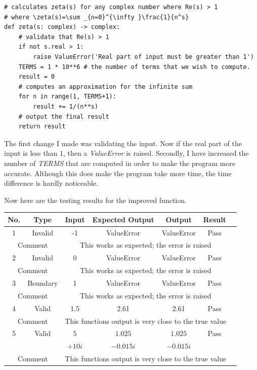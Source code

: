 \documentclass{article}
\begin{document}
\begin{lstlisting}
# calculates zeta(s) for any complex number where Re(s) > 1
# where \zeta(s)=\sum _{n=0}^{\infty }\frac{1}{n^s}
def zeta(s: complex) -> complex:
    # validate that Re(s) > 1
    if not s.real > 1:
        raise ValueError('Real part of input must be greater than 1')
    TERMS = 1 * 10**6 # the number of terms that we wish to compute.
    result = 0
    # computes an approximation for the infinite sum
    for n in range(1, TERMS+1):
        result += 1/(n**s)
    # output the final result
    return result
\end{lstlisting}

The first change I made was validating the input. Now if the real part of the input is less than $1$, then a \textit{ValueError} is raised. Secondly, I have increased the number of \textit{TERMS} that are computed in order to make the program more accurate. Although this does make the program take more time, the time difference is hardly noticeable.

Now here are the testing results for the improved function.

\begin{table}[ht]
    \centering
    \begin{tabular}{|c|c|c|c|c|c|c|}
    \hline
    \textbf{No.} & \textbf{Type} & \textbf{Input} & \textbf{Expected Output} & \textbf{Output} & \textbf{Result}\\
    \hline
    \hline
    1 & Invalid & -1 & ValueError & ValueError & Pass\\
    \hline
    \multicolumn{2}{|c|}{Comment} & \multicolumn{4}{|c|}{This works as expected; the error is raised}\\
    \hline
    \hline
    2 & Invalid & 0 & ValueError & ValueError & Pass\\
    \hline
    \multicolumn{2}{|c|}{Comment} & \multicolumn{4}{|c|}{This works as expected; the error is raised}\\
    \hline
    \hline
    3 & Boundary & 1 & ValueError & ValueError & Pass\\
    \hline
    \multicolumn{2}{|c|}{Comment} & \multicolumn{4}{|c|}{This works as expected; the error is raised}\\
    \hline
    \hline
    4 & Valid & 1.5 & 2.61 & 2.61 & Pass\\
    \hline
    \multicolumn{2}{|c|}{Comment} & \multicolumn{4}{|c|}{This functions output is very close to the true value}\\
    \hline
    \hline
    5 & Valid & $5$ & $1.025$ & $1.025$ & Pass\\
      & & $+10i$ & $-0.015i$ & $-0.015i$  & \\
    \hline
    \multicolumn{2}{|c|}{Comment} & \multicolumn{4}{|c|}{This functions output is very close to the true value}\\
    \hline
    \end{tabular}
\end{table}
\end{document}
